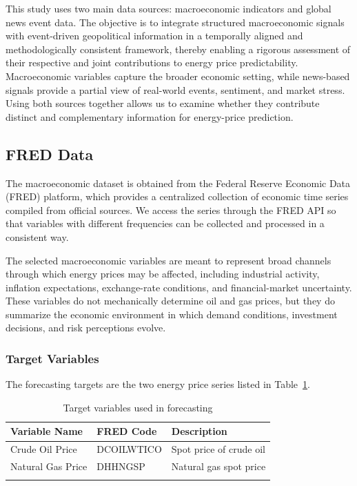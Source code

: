 \documentclass[pdflatex,sn-mathphys-num]{sn-jnl}%
\theoremstyle{thmstyleone}%
\theoremstyle{thmstyletwo}%
\theoremstyle{thmstylethree}%
\begin{document}
This study uses two main data sources: macroeconomic indicators and global news event data. The objective is to integrate structured macroeconomic signals with event-driven geopolitical information in a temporally aligned and methodologically consistent framework, thereby enabling a rigorous assessment of their respective and joint contributions to energy price predictability. Macroeconomic variables capture the broader economic setting, while news-based signals provide a partial view of real-world events, sentiment, and market stress. Using both sources together allows us to examine whether they contribute distinct and complementary information for energy-price prediction.

\subsection{FRED Data}\label{subsec:freddata}

The macroeconomic dataset is obtained from the Federal Reserve Economic Data (FRED) platform, which provides a centralized collection of economic time series compiled from official sources. We access the series through the FRED API so that variables with different frequencies can be collected and processed in a consistent way.

The selected macroeconomic variables are meant to represent broad channels through which energy prices may be affected, including industrial activity, inflation expectations, exchange-rate conditions, and financial-market uncertainty. These variables do not mechanically determine oil and gas prices, but they do summarize the economic environment in which demand conditions, investment decisions, and risk perceptions evolve.

\subsubsection{Target Variables}\label{subsubsec:targets}

The forecasting targets are the two energy price series listed in Table~\ref{tab:target_variables}.\\

\begin{table}[h]
\caption{Target variables used in forecasting}\label{tab:target_variables}
\begin{tabular}{@{}lll@{}}
\toprule
Variable Name & FRED Code & Description \\
\midrule
Crude Oil Price & DCOILWTICO & Spot price of crude oil \\
Natural Gas Price & DHHNGSP & Natural gas spot price \\
\botrule
\end{tabular}
\end{table}
\end{document}
